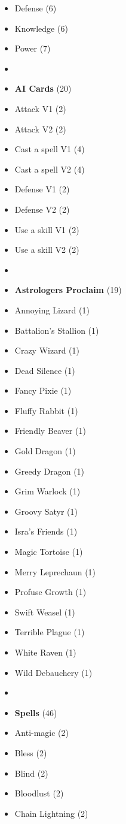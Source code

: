 \begin{multicols*}{3}
\begin{itemize}[leftmargin=0pt, label={}, noitemsep]
  \item Defense (6)
  \item Knowledge (6)
  \item Power (7)
  \item
  \item \textbf{AI Cards} (20)
  \item Attack V1 (2)
  \item Attack V2 (2)
  \item Cast a spell V1 (4)
  \item Cast a spell V2 (4)
  \item Defense V1 (2)
  \item Defense V2 (2)
  \item Use a skill V1 (2)
  \item Use a skill V2 (2)
  \item
  \item \textbf{Astrologers Proclaim} (19)
  \item Annoying Lizard (1)
  \item Battalion's Stallion (1)
  \item Crazy Wizard (1)
  \item Dead Silence (1)
  \item Fancy Pixie (1)
  \item Fluffy Rabbit (1)
  \item Friendly Beaver (1)
  \item Gold Dragon (1)
  \item Greedy Dragon (1)
  \item Grim Warlock (1)
  \item Groovy Satyr (1)
  \item Isra's Friends (1)
  \item Magic Tortoise (1)
  \item Merry Leprechaun (1)
  \item Profuse Growth (1)
  \item Swift Weasel (1)
  \item Terrible Plague (1)
  \item White Raven (1)
  \item Wild Debauchery (1)
  \item
  \item \textbf{Spells} (46)
  \item Anti-magic (2)
  \item Bless (2)
  \item Blind (2)
  \item Bloodlust (2)
  \item Chain Lightning (2)

\end{itemize}
\end{multicols*}
